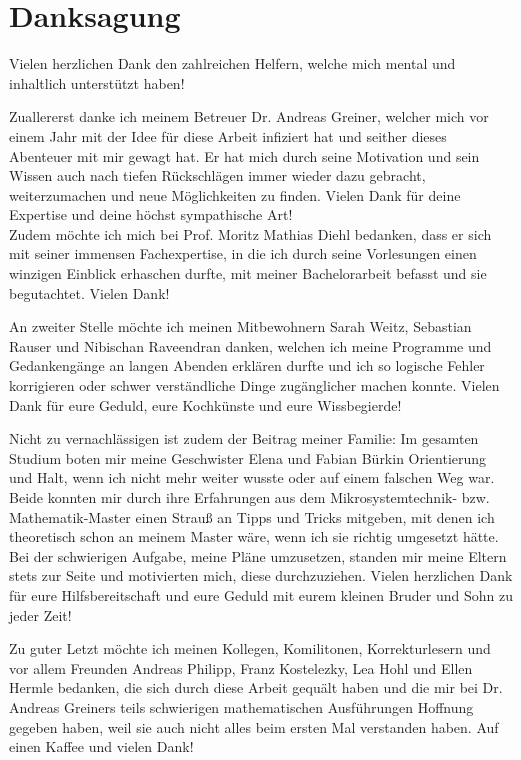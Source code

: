 \chapter{Danksagung}
Vielen herzlichen Dank den zahlreichen Helfern, welche mich mental und inhaltlich unterstützt haben!

Zuallererst danke ich meinem Betreuer Dr. Andreas Greiner, welcher mich vor einem Jahr mit der Idee für diese Arbeit infiziert hat und seither dieses Abenteuer mit mir gewagt hat. Er hat mich durch seine Motivation und sein Wissen auch nach tiefen Rückschlägen immer wieder dazu gebracht, weiterzumachen und neue Möglichkeiten zu finden. Vielen Dank für deine Expertise und deine höchst sympathische Art!\\
Zudem möchte ich mich bei Prof. Moritz Mathias Diehl bedanken, dass er sich mit seiner immensen Fachexpertise, in die ich durch seine Vorlesungen einen winzigen Einblick erhaschen durfte, mit meiner Bachelorarbeit befasst und sie begutachtet. Vielen Dank!

An zweiter Stelle möchte ich meinen Mitbewohnern Sarah Weitz, Sebastian Rauser und Nibischan Raveendran danken, welchen ich meine Programme und Gedankengänge an langen Abenden erklären durfte und ich so logische Fehler korrigieren oder schwer verständliche Dinge zugänglicher machen konnte. Vielen Dank für eure Geduld, eure Kochkünste und eure Wissbegierde!

Nicht zu vernachlässigen ist zudem der Beitrag meiner Familie: Im gesamten Studium boten mir meine Geschwister Elena und Fabian Bürkin Orientierung und Halt, wenn ich nicht mehr weiter wusste oder auf einem falschen Weg war. Beide konnten mir durch ihre Erfahrungen aus dem Mikrosystemtechnik- bzw. Mathematik-Master einen Strauß an Tipps und Tricks mitgeben, mit denen ich theoretisch schon an meinem Master wäre, wenn ich sie richtig umgesetzt hätte. Bei der schwierigen Aufgabe, meine Pläne umzusetzen, standen mir meine Eltern stets zur Seite und motivierten mich, diese durchzuziehen. Vielen herzlichen Dank für eure Hilfsbereitschaft und eure Geduld mit eurem kleinen Bruder und Sohn zu jeder Zeit!

Zu guter Letzt möchte ich meinen Kollegen, Komilitonen, Korrekturlesern und vor allem Freunden Andreas Philipp, Franz Kostelezky, Lea Hohl und Ellen Hermle bedanken, die sich durch diese Arbeit gequält haben und die mir bei Dr. Andreas Greiners teils schwierigen mathematischen Ausführungen Hoffnung gegeben haben, weil sie auch nicht alles beim ersten Mal verstanden haben. Auf einen Kaffee und vielen Dank!